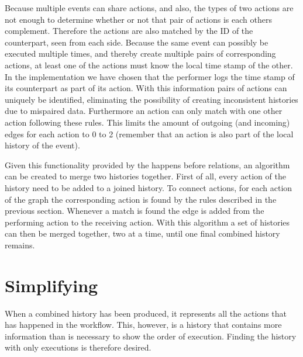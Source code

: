 	\newpar Because multiple events can share actions, and also, the types of two actions are not enough to determine whether or not that pair of actions is each others complement. Therefore the actions are also matched by the ID of the counterpart, seen from each side. Because the same event can possibly be executed multiple times, and thereby create multiple pairs of corresponding actions, at least one of the actions must know the local time stamp of the other. In the implementation we have chosen that the performer logs the time stamp of its counterpart as part of its action. With this information pairs of actions can uniquely be identified, eliminating the possibility of creating inconsistent histories due to mispaired  data. Furthermore an action can only match with one other action following these rules. This limits the amount of outgoing (and incoming) edges for each action to 0 to 2 (remember that an action is also part of the local history of the event).
	
	Given this functionality provided by the happens before relations, an algorithm can be created to merge two histories together. First of all, every action of the history need to be added to a joined history. To connect actions, for each action of the graph the corresponding action is found by the rules described in the previous section. Whenever a match is found the edge is added from the performing action to the receiving action. With this algorithm a set of histories can then be merged together, two at a time, until one final combined history remains.
	
	\section{Simplifying}
	When a combined history has been produced, it represents all the actions that has happened in the workflow. This, however, is a history that contains more information than is necessary to show the order of execution. Finding the history with only executions is therefore desired.
	
	
